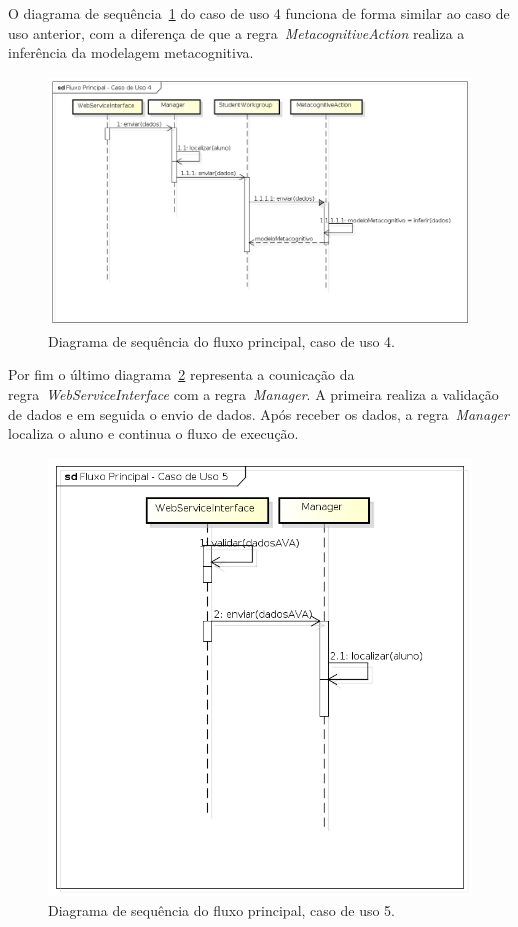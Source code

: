 O diagrama de sequência~\ref{fig:dss-uc4-fluxo-principal} do caso de uso 4 funciona de forma similar ao caso de uso anterior, com a diferença de que a regra~\emph{MetacognitiveAction} realiza a inferência da modelagem metacognitiva.

\begin{figure}
	\centering
	\includegraphics[scale=0.48]{images/dss-uc4-fluxo-principal.png}
	\caption{Diagrama de sequência do fluxo principal, caso de uso 4.}
	\label{fig:dss-uc4-fluxo-principal}
\end{figure}

Por fim o último diagrama~\ref{fig:dss-uc5-fluxo-principal} representa a counicação da regra~\emph{WebServiceInterface} com a regra~\emph{Manager}. A primeira realiza a validação de dados e em seguida o envio de dados. Após receber os dados, a regra~\emph{Manager} localiza o aluno e continua o fluxo de execução.

\begin{figure}
	\centering
	\includegraphics[scale=0.48]{images/dss-uc5-fluxo-principal.png}
	\caption{Diagrama de sequência do fluxo principal, caso de uso 5.}
	\label{fig:dss-uc5-fluxo-principal}
\end{figure}

